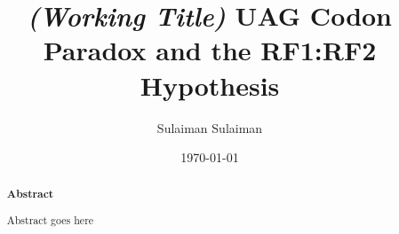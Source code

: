 \documentclass[
    emulatestandardclasses,
    parskip=half,
]{scrartcl}
\begin{document}
    \title{\textit{(Working Title)} UAG Codon Paradox and the RF1:RF2 Hypothesis}
    \date{\today}
    \author{Sulaiman Sulaiman}
    \maketitle

    \begin{abstract}
        {\textbf{Abstract}\vspace{1em}}

        Abstract goes here
    \end{abstract}

    \pagebreak
    \pagebreak
    \pagebreak
    \pagebreak

	\newpage {}
    \newrefcontext[sorting=nyt]
    \nocite{anaconda,SciPy,NumPy,pandas,biopython,statsmodels,matplotlib,R,tidyverse,ggrepel,tqdm,gffutils}
	\printbibliography[notkeyword=software]
	\printbibliography[keyword=software, title={Software \& Libraries}]
	\appendix\appendixpage
\end{document}
